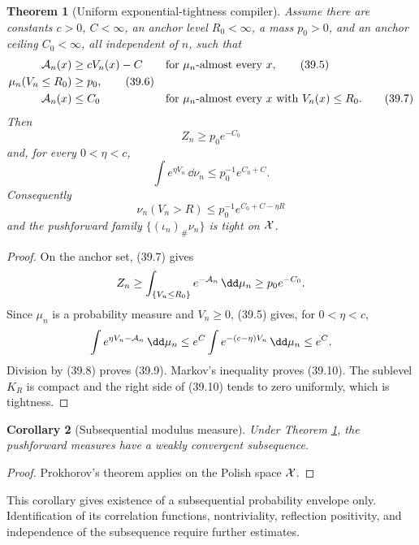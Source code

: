 \documentclass[11pt]{article}
\newtheorem{theorem}{Theorem}[section]
\newtheorem{corollary}[theorem]{Corollary}
\theoremstyle{remark}
\begin{document}
\begin{theorem}[Uniform exponential-tightness compiler]
\label{thm:v15v39-tightness}
Assume there are constants \(c>0\), \(C<\infty\), an anchor level
\(R_0<\infty\), a mass \(p_0>0\), and an anchor ceiling
\(C_0<\infty\), all independent of \(n\), such that
\begin{align}
 {\cal A}_n(x)&\geq cV_n(x)-C
 &&\text{for \(\mu_n\)-almost every \(x\)},              \tag{39.5}\\
 \mu_n(V_n\leq R_0)&\geq p_0,                            \tag{39.6}\\
 {\cal A}_n(x)&\leq C_0
 &&\text{for \(\mu_n\)-almost every \(x\) with
             \(V_n(x)\leq R_0\)}.                       \tag{39.7}
\end{align}
Then
\[
 Z_n\geq p_0e^{-C_0}                                    \tag{39.8}
\]
and, for every \(0<\eta<c\),
\[
 \boxed{
 \int e^{\eta V_n}\,\dd\nu_n
 \leq p_0^{-1}e^{C_0+C}.}                               \tag{39.9}
\]
Consequently
\[
 \boxed{
 \nu_n(V_n>R)
 \leq p_0^{-1}e^{C_0+C-\eta R}}                         \tag{39.10}
\]
and the pushforward family
\(\{(\iota_n)_\#\nu_n\}\) is tight on \({\cal X}\).
\end{theorem}

\begin{proof}
On the anchor set, (39.7) gives
\[
 Z_n\geq\int_{\{V_n\leq R_0\}}e^{-{\cal A}_n}\,\dd\mu_n
 \geq p_0e^{-C_0}.
\]
Since \(\mu_n\) is a probability measure and \(V_n\geq0\),
(39.5) gives, for \(0<\eta<c\),
\[
 \int e^{\eta V_n-{\cal A}_n}\,\dd\mu_n
 \leq e^C\int e^{-(c-\eta)V_n}\,\dd\mu_n
 \leq e^C.
\]
Division by (39.8) proves (39.9).  Markov's inequality proves
(39.10).  The sublevel \(K_R\) is compact and the right side of
(39.10) tends to zero uniformly, which is tightness.
\end{proof}

\begin{corollary}[Subsequential modulus measure]
\label{cor:v15v39-prokhorov}
Under Theorem \ref{thm:v15v39-tightness}, the pushforward measures
have a weakly convergent subsequence.
\end{corollary}

\begin{proof}
Prokhorov's theorem applies on the Polish space \({\cal X}\).
\end{proof}

This corollary gives existence of a subsequential probability
envelope only.  Identification of its correlation functions,
nontriviality, reflection positivity, and independence of the
subsequence require further estimates.
\end{document}
